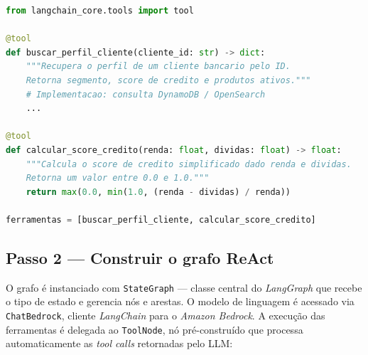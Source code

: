 \begin{lstlisting}[language=Python,
  caption={Defini\c{c}\~ao de ferramentas com \texttt{@tool}.},
  label={lst:tools_definition}]
from langchain_core.tools import tool

@tool
def buscar_perfil_cliente(cliente_id: str) -> dict:
    """Recupera o perfil de um cliente bancario pelo ID.
    Retorna segmento, score de credito e produtos ativos."""
    # Implementacao: consulta DynamoDB / OpenSearch
    ...

@tool
def calcular_score_credito(renda: float, dividas: float) -> float:
    """Calcula o score de credito simplificado dado renda e dividas.
    Retorna um valor entre 0.0 e 1.0."""
    return max(0.0, min(1.0, (renda - dividas) / renda))

ferramentas = [buscar_perfil_cliente, calcular_score_credito]
\end{lstlisting}

\subsection{Passo 2 --- Construir o grafo ReAct}

O grafo \'e instanciado com \texttt{StateGraph} --- classe central do
\textit{LangGraph} que recebe o tipo de estado e gerencia n\'os e arestas.
O modelo de linguagem \'e acessado via \texttt{ChatBedrock}, cliente
\textit{LangChain} para o \textit{Amazon Bedrock}. A execu\c{c}\~ao das
ferramentas \'e delegada ao \texttt{ToolNode}, n\'o pr\'e-constru\'ido
que processa automaticamente as \textit{tool calls} retornadas pelo LLM:

